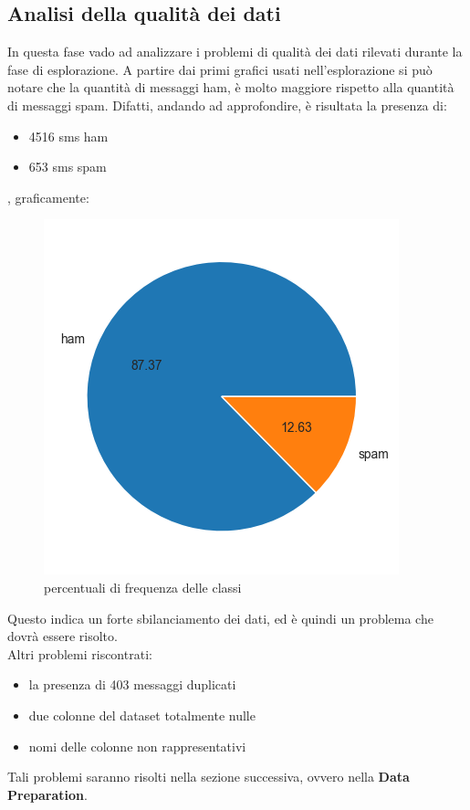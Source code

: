 \documentclass[]{article}
\begin{document}
    \subsection{Analisi della qualità dei dati}
        In questa fase vado ad analizzare i problemi di qualità dei dati rilevati durante la fase di esplorazione. A partire dai primi grafici usati nell'esplorazione si può notare che la quantità di messaggi ham, è molto maggiore rispetto alla quantità di messaggi spam.
        Difatti, andando ad approfondire, è risultata la presenza di:
        \begin{itemize}
            \item 4516 sms ham
            \item 653 sms spam
        \end{itemize}
        , graficamente:
        \begin{figure}[H]
            \centering
            \includegraphics[width=0.5\linewidth]{images/sbilanciamento.png}
            \caption{percentuali di frequenza delle classi}
            \label{fig:enter-label}
        \end{figure}
        Questo indica un forte sbilanciamento dei dati, ed è quindi un problema che dovrà essere risolto. \\
        Altri problemi riscontrati:
        \begin{itemize}
            \item la presenza di 403 messaggi duplicati
            \item due colonne del dataset totalmente nulle
            \item nomi delle colonne non rappresentativi
        \end{itemize}
        Tali problemi saranno risolti nella sezione successiva, ovvero nella \textbf{Data Preparation}.

    \newpage
\end{document}
